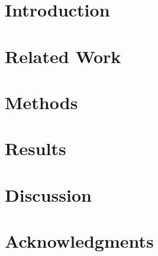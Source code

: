 \documentclass[fleqn,moreauthors,10pt]{ds_report}
\affiliation{\textit{Advisors: Slavko Žitnik}}
\begin{document}
\flushbottom 

\maketitle 

\thispagestyle{empty} 

\section*{Introduction}

\section*{Related Work}

\section*{Methods}

\section*{Results}

\section*{Discussion}

\section*{Acknowledgments}



\end{document}

